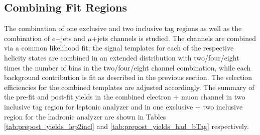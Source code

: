 
\subsection{Combining Fit Regions}
The combination of one exclusive and two inclusive \bt tag regions as well as the combination of $e$+jets and $\mu$+jets channels is studied. The channels are combined via a common likelihood fit; the signal templates for each of the respective helicity states are combined in an extended distribution with two/four/eight times the number of bins in the two/four/eight channel combination, while each background contribution is fit as described in the previous section. The selection efficiencies for the combined templates are adjusted accordingly. The summary of the pre-fit and post-fit yields in the combined electron + muon channel in two inclusive \bt tag region for leptonic analyzer and in one exclusive + two inclusive \bt region for the hadronic analyzer are shown in Tables \ref{tab:prepost_yields_lep2incl} and \ref{tab:prepost_yields_had_bTag} respectively.

